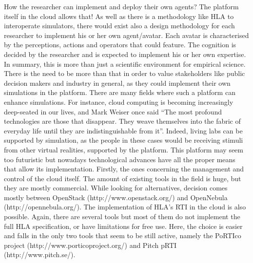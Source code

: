 \documentclass[a0paper,fontscale=0.4125,landscape]{baposter} %
\begin{document}
\begin{poster}
{How the researcher can implement and deploy their own agents? The platform itself in the cloud allows that! As well as there is a methodology like HLA to interoperate simulators, there would exist also a design methodology for each researcher to implement his or her own agent/avatar. Each avatar is characterised by the perceptions, actions and operators that could feature. The cognition is decided by the researcher and is expected to implement his or her own expertise. In summary, this is more than just a scientific environment for empirical science. There is the need to be more than that in order to value stakeholders like public decision makers and industry in general, as they could implement their own simulations in the platform.
There are many fields where such a platform can enhance simulations. For instance, cloud computing is becoming increasingly deep-seated in our lives, and Mark Weiser once said ``The most profound technologies are those that disappear. They weave themselves into the fabric of everyday life until they are indistinguishable from it''. Indeed, living labs can be supported by simulation, as the people in these cases would be receiving stimuli from other virtual realities, supported by the platform.
This platform may seem too futuristic but nowadays technological advances have all the proper means that allow its implementation. Firstly, the ones concerning the management and control of the cloud itself. The amount of existing tools in the field is huge, but they are mostly commercial. While looking for alternatives, decision comes mostly between OpenStack (http://www.openstack.org/) and OpenNebula (http://opennebula.org/).
The implementation of HLA's RTI in the cloud is also possible. Again, there are several tools but most of them do not implement the full HLA specification, or have limitations for free use. Here, the choice is easier and falls in the only two tools that seem to be still active, namely the PoRTIco project (http://www.porticoproject.org/) and Pitch pRTI (http://www.pitch.se/).


}

\end{poster}
\end{document}
